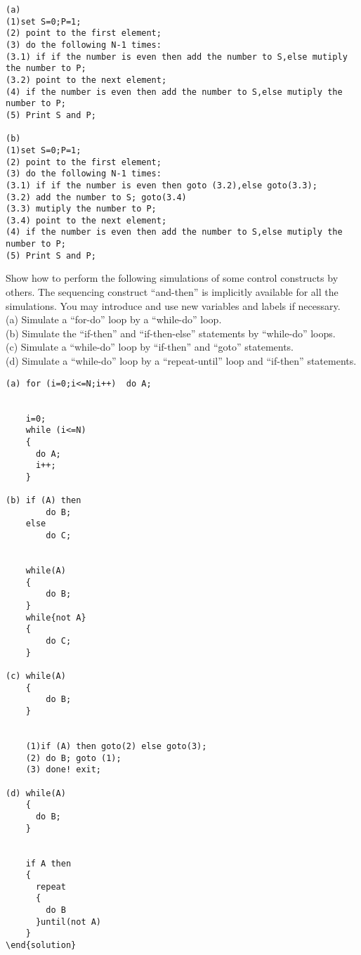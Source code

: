 \documentclass[11pt, a4paper, UTF8]{ctexart}
\begin{document}
\begin{solution}
\begin{verbatim}
(a)
(1)set S=0;P=1;
(2) point to the first element;
(3) do the following N-1 times:
(3.1) if if the number is even then add the number to S,else mutiply the number to P;
(3.2) point to the next element;
(4) if the number is even then add the number to S,else mutiply the number to P;
(5) Print S and P;

(b)
(1)set S=0;P=1;
(2) point to the first element;
(3) do the following N-1 times:
(3.1) if if the number is even then goto (3.2),else goto(3.3);
(3.2) add the number to S; goto(3.4)
(3.3) mutiply the number to P;
(3.4) point to the next element;
(4) if the number is even then add the number to S,else mutiply the number to P;
(5) Print S and P;
\end{verbatim}
\end{solution}



\begin{problem}[DH：2.5] %
Show how to perform the following simulations of some control constructs by others. The sequencing construct “and-then” is implicitly available for all the simulations. You may introduce and use new variables and labels if necessary.\\
(a) Simulate a “for-do” loop by a “while-do” loop.\\
(b) Simulate the “if-then” and “if-then-else” statements by “while-do” loops.\\
(c) Simulate a “while-do” loop by “if-then” and “goto” statements.\\
(d) Simulate a “while-do” loop by a “repeat-until” loop and “if-then” statements.
\end{problem}

\begin{solution}
\begin{verbatim}
(a) for (i=0;i<=N;i++)  do A;


    i=0;
    while (i<=N)
    {
      do A;
      i++;
    }

(b) if (A) then 
        do B;
    else 
        do C;


    while(A)
    {
        do B;
    }
    while{not A}
    {
        do C;
    }

(c) while(A)
    {
        do B;
    }


    (1)if (A) then goto(2) else goto(3);
    (2) do B; goto (1);
    (3) done! exit;

(d) while(A)
    {
      do B;
    }


    if A then
    {
      repeat
      {
        do B
      }until(not A)
    }
\end{solution}
\end{verbatim}
\end{solution}
\end{document}
